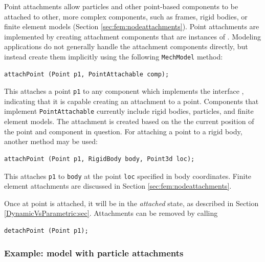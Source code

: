 Point attachments allow particles and other point-based components to
be attached to other, more complex components, such as frames, rigid
bodies, or finite element models (Section \ref{sec:fem:nodeattachments}). Point
attachments are implemented by creating attachment components that are
instances of .
Modeling applications do not generally handle the attachment
components directly, but instead create them implicitly using the
following {\tt MechModel} method:
%
\begin{lstlisting}[]
  attachPoint (Point p1, PointAttachable comp);
\end{lstlisting}
%
This attaches a point {\tt p1} to any component which implements the
interface ,
indicating that it is capable creating an attachment to a
point. Components that implement {\tt PointAttachable} currently
include rigid bodies, particles, and finite element models. The
attachment is created based on the the current position of the point
and component in question.  For attaching a point to a rigid body,
another method may be used:
%
\begin{lstlisting}[]
  attachPoint (Point p1, RigidBody body, Point3d loc);
\end{lstlisting}
%
This attaches {\tt p1} to {\tt body} at the point {\tt loc} specified
in body coordinates.  Finite element attachments are discussed in
Section \ref{sec:fem:nodeattachments}.

Once at point is attached, it
will be in the {\it attached} state, as described in Section
\ref{DynamicVsParametric:sec}.  Attachments can be removed by
calling
%
\begin{lstlisting}[]
  detachPoint (Point p1);   
\end{lstlisting}
%

\subsubsection{Example: model with particle attachments}

